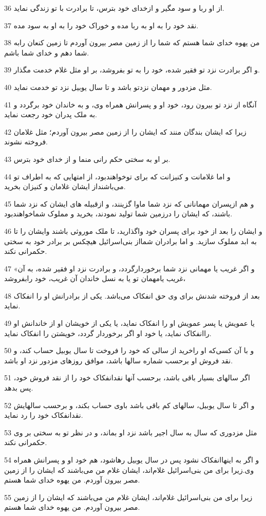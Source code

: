 \par 36 از او ربا و سود مگیر و ازخدای خود بترس، تا برادرت با تو زندگی نماید.
\par 37 نقد خود را به او به ربا مده و خوراک خود را به او به سود مده.
\par 38 من یهوه خدای شما هستم که شما را از زمین مصر بیرون آوردم تا زمین کنعان رابه شما دهم و خدای شما باشم.
\par 39 و اگر برادرت نزد تو فقیر شده، خود را به تو بفروشد، بر او مثل غلام خدمت مگذار.
\par 40 مثل مزدور و مهمان نزدتو باشد و تا سال یوبیل نزد تو خدمت نماید.
\par 41 آنگاه از نزد تو بیرون رود، خود او و پسرانش همراه وی، و به خاندان خود برگردد و به ملک پدران خود رجعت نماید.
\par 42 زیرا که ایشان بندگان منند که ایشان را از زمین مصر بیرون آوردم؛ مثل غلامان فروخته نشوند.
\par 43 بر او به سختی حکم رانی منما و از خدای خود بترس.
\par 44 و اما غلامانت و کنیزانت که برای توخواهندبود، از امتهایی که به اطراف تو می‌باشنداز ایشان غلامان و کنیزان بخرید.
\par 45 و هم ازپسران مهمانانی که نزد شما ماوا گزینند، و ازقبیله های ایشان که نزد شما باشند، که ایشان را درزمین شما تولید نمودند، بخرید و مملوک شماخواهندبود.
\par 46 و ایشان را بعد از خود برای پسران خود واگذارید، تا ملک موروثی باشند وایشان را تا به ابد مملوک سازید. و اما برادران شمااز بنی‌اسرائیل هیچکس بر برادر خود به سختی حکمرانی نکند.
\par 47 «و اگر غریب یا مهمانی نزد شما برخوردارگردد، و برادرت نزد او فقیر شده، به آن غریب یامهمان تو یا به نسل خاندان آن غریب، خود رابفروشد،
\par 48 بعد از فروخته شدنش برای وی حق انفکاک می‌باشد. یکی از برادرانش او را انفکاک نماید.
\par 49 یا عمویش یا پسر عمویش او را انفکاک نماید، یا یکی از خویشان او از خاندانش او راانفکاک نماید، یا خود او اگر برخوردار گردد، خویشتن را انفکاک نماید.
\par 50 و با آن کسی‌که او راخرید از سالی که خود را فروخت تا سال یوبیل حساب کند، و نقد فروش او برحسب شماره سالها باشد، موافق روزهای مزدور نزد او باشد.
\par 51 اگر سالهای بسیار باقی باشد، برحسب آنها نقدانفکاک خود را از نقد فروش خود، پس بدهد.
\par 52 و اگر تا سال یوبیل، سالهای کم باقی باشد باوی حساب بکند، و برحسب سالهایش نقدانفکاک خود را رد نماید.
\par 53 مثل مزدوری که سال به سال اجیر باشد نزد او بماند، و در نظر تو به سختی بر وی حکمرانی نکند.
\par 54 و اگر به اینهاانفکاک نشود پس در سال یوبیل رهاشود، هم خود او و پسرانش همراه وی.زیرا برای من بنی‌اسرائیل غلام‌اند، ایشان غلام من می‌باشند که ایشان را از زمین مصر بیرون آوردم. من یهوه خدای شما هستم.
\par 55 زیرا برای من بنی‌اسرائیل غلام‌اند، ایشان غلام من می‌باشند که ایشان را از زمین مصر بیرون آوردم. من یهوه خدای شما هستم.
 
